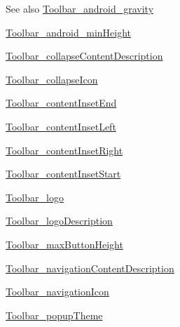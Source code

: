 \begin{DoxySeeAlso}{See also}
\hyperlink{classandroid_1_1support_1_1v7_1_1mediarouter_1_1R_1_1styleable_a3d2dddda90688124695406ed25e401e5}{Toolbar\+\_\+android\+\_\+gravity} 

\hyperlink{classandroid_1_1support_1_1v7_1_1mediarouter_1_1R_1_1styleable_a22666f41befa7bb4b75c5c670e5cc5ce}{Toolbar\+\_\+android\+\_\+min\+Height} 

\hyperlink{classandroid_1_1support_1_1v7_1_1mediarouter_1_1R_1_1styleable_a9ee92a8c7ef0336e84eb2c6ea27db9d6}{Toolbar\+\_\+collapse\+Content\+Description} 

\hyperlink{classandroid_1_1support_1_1v7_1_1mediarouter_1_1R_1_1styleable_a93c3561c7efd4ac1f04f5d87f57da44e}{Toolbar\+\_\+collapse\+Icon} 

\hyperlink{classandroid_1_1support_1_1v7_1_1mediarouter_1_1R_1_1styleable_a8f713fe1fbe5422e426d843e644451f3}{Toolbar\+\_\+content\+Inset\+End} 

\hyperlink{classandroid_1_1support_1_1v7_1_1mediarouter_1_1R_1_1styleable_a37a31055586c7afd817372e689144033}{Toolbar\+\_\+content\+Inset\+Left} 

\hyperlink{classandroid_1_1support_1_1v7_1_1mediarouter_1_1R_1_1styleable_ad92866111ec3cf5e0b183e9fba9b637e}{Toolbar\+\_\+content\+Inset\+Right} 

\hyperlink{classandroid_1_1support_1_1v7_1_1mediarouter_1_1R_1_1styleable_a46fac76c3774e9ae389554b7c4485493}{Toolbar\+\_\+content\+Inset\+Start} 

\hyperlink{classandroid_1_1support_1_1v7_1_1mediarouter_1_1R_1_1styleable_ab965f1cf2cb8e80419699e46c728bc5e}{Toolbar\+\_\+logo} 

\hyperlink{classandroid_1_1support_1_1v7_1_1mediarouter_1_1R_1_1styleable_aa07c1902f3672989051d9bdae17e9fae}{Toolbar\+\_\+logo\+Description} 

\hyperlink{classandroid_1_1support_1_1v7_1_1mediarouter_1_1R_1_1styleable_a4ca61dab98fe3ca8b16448d7177099ae}{Toolbar\+\_\+max\+Button\+Height} 

\hyperlink{classandroid_1_1support_1_1v7_1_1mediarouter_1_1R_1_1styleable_afe01241b2d5b5f87f898aa12e71cfa1c}{Toolbar\+\_\+navigation\+Content\+Description} 

\hyperlink{classandroid_1_1support_1_1v7_1_1mediarouter_1_1R_1_1styleable_a19bd33bd2c0ed2e7c65711493473a5f9}{Toolbar\+\_\+navigation\+Icon} 

\hyperlink{classandroid_1_1support_1_1v7_1_1mediarouter_1_1R_1_1styleable_a48b8c2cdd2d740aa2c3750514fedfb2a}{Toolbar\+\_\+popup\+Theme} 


\end{DoxySeeAlso}
